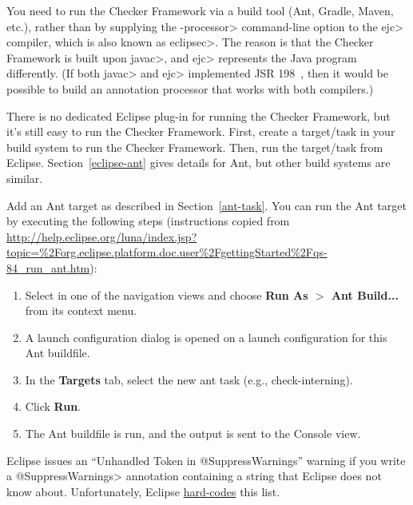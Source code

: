 You
need to run the Checker Framework via a build tool (Ant, Gradle, Maven, etc.), rather
than by supplying the \<-processor> command-line option to the \<ejc>
compiler, which is also known as \<eclipsec>.
The reason is that the Checker Framework is built upon \<javac>,
and \<ejc> represents the Java program differently.  (If both \<javac> and \<ejc>
implemented JSR 198~\cite{JSR198}, then it would be possible to build
an annotation processor that works with both compilers.)


There is no dedicated Eclipse plug-in for running the Checker Framework,
but it's still easy to run the Checker Framework.  First, create a
target/task in your build system to run the Checker Framework.  Then, run
the target/task from Eclipse.  Section~\ref{eclipse-ant} gives details for
Ant, but other build systems are similar.



Add an Ant target as described in Section~\ref{ant-task}.  You can
run the Ant target by executing the following steps
(instructions copied from
{\codesize\url{http://help.eclipse.org/luna/index.jsp?topic=%2Forg.eclipse.platform.doc.user%2FgettingStarted%2Fqs-84_run_ant.htm}}):

\begin{enumerate}

\item
  Select  in one of the navigation views and choose
  {\bf Run As $>$ Ant Build...} from its context menu.

\item
  A launch configuration dialog is opened on a launch configuration
  for this Ant buildfile.

\item
  In the {\bf Targets} tab, select the new ant task (e.g., check-interning).

\item
  Click {\bf Run}.

\item
  The Ant buildfile is run, and the output is sent to the Console view.

\end{enumerate}



Eclipse issues an ``Unhandled Token in @SuppressWarnings'' warning if you
write a \<@SuppressWarnings> annotation containing a string that Eclipse does not
know about.  Unfortunately, Eclipse
\href{https://bugs.eclipse.org/bugs/show_bug.cgi?id=122475}{hard-codes}
this list.

